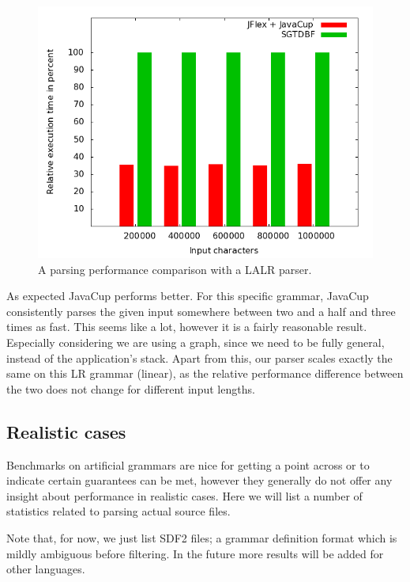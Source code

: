 \documentclass[a4paper,10pt]{article}
\begin{document}
\begin{figure}[H]
\centering
\includegraphics[scale=0.4]{vsLALR.png}
\caption{A parsing performance comparison with a LALR parser.}
\end{figure}

As expected JavaCup performs better. For this specific grammar, JavaCup consistently parses the given input somewhere between two and a half and three times as fast. This seems like a lot, however it is a fairly reasonable result. Especially considering we are using a graph, since we need to be fully general, instead of the application's stack. Apart from this, our parser scales exactly the same on this LR grammar (linear), as the relative performance difference between the two does not change for different input lengths.

\subsection{Realistic cases}

Benchmarks on artificial grammars are nice for getting a point across or to indicate certain guarantees can be met, however they generally do not offer any insight about performance in realistic cases. Here we will list a number of statistics related to parsing actual source files.

Note that, for now, we just list SDF2 files; a grammar definition format which is mildly ambiguous before filtering. In the future more results will be added for other languages.
\end{document}
